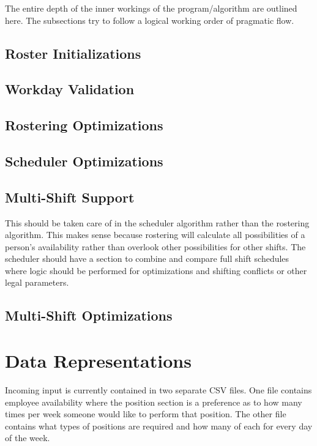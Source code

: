 \documentclass[a4paper,11pt]{article}
\begin{document}
The entire depth of the inner workings of the program/algorithm are outlined here. 
The subsections try to follow a logical working order of pragmatic flow.

\subsection{Roster Initializations}
\subsection{Workday Validation}
\subsection{Rostering Optimizations}
\subsection{Scheduler Optimizations}
\subsection{Multi-Shift Support}

This should be taken care of in the scheduler algorithm rather than the rostering algorithm.
This makes sense because rostering will calculate all possibilities of a person's availability rather than overlook other possibilities for other shifts.
The scheduler should have a section to combine and compare full shift schedules where logic should be performed for optimizations and shifting conflicts or other legal parameters.

\subsection{Multi-Shift Optimizations}

\section{Data Representations}

Incoming input is currently contained in two separate CSV files. 
One file contains employee availability where the position section is a preference as to how many times per week someone would like to perform that position. The other file contains what types of positions are required and how many of each for every day of the week.
\end{document}
